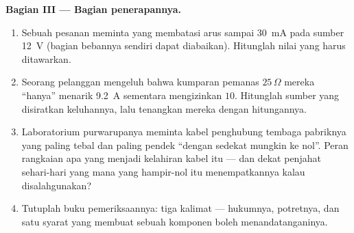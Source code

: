\begin{problem}
\medskip\noindent\textbf{Bagian III --- Bagian
penerapannya.}
\begin{enumerate}[resume]
  \item Sebuah pesanan meminta  yang membatasi arus sampai
        \qty{30}{mA} pada sumber \qty{12}{V} (bagian bebannya sendiri
        dapat diabaikan). Hitunglah nilai yang harus ditawarkan.
  \item Seorang pelanggan mengeluh bahwa kumparan pemanas
        $25\,\Omega$ mereka ``hanya'' menarik \qty{9.2}{A} sementara
         mengizinkan $10$. Hitunglah  sumber yang
        disiratkan keluhannya, lalu tenangkan mereka dengan
        hitungannya.
  \item Laboratorium purwarupanya meminta kabel penghubung tembaga
        pabriknya yang paling tebal dan paling pendek ``dengan 
        sedekat mungkin ke nol''. Peran rangkaian apa yang menjadi
        kelahiran kabel itu --- dan dekat penjahat sehari-hari yang
        mana  yang hampir-nol itu menempatkannya kalau
        disalahgunakan?
  \item Tutuplah buku pemeriksaannya: tiga kalimat --- hukumnya,
        potretnya, dan satu syarat yang membuat sebuah komponen boleh
        menandatanganinya.
\end{enumerate}
\end{problem}
